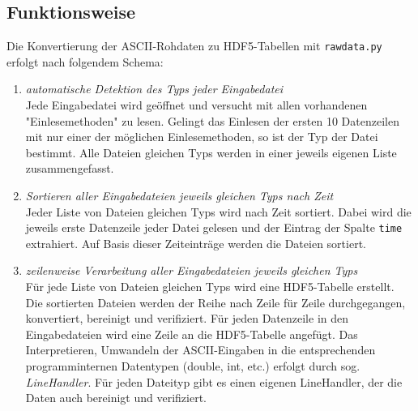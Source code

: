 \documentclass[version=last,
	a4paper,			%
	pagesize, 			%
	11pt,				%
	BCOR1cm,			%
	DIV12,	 			%
	pointlessnumbers,   %
	halfparskip,		%
]{scrreprt}
\begin{document}
\subsection{Funktionsweise}
Die Konvertierung der ASCII-Rohdaten zu HDF5-Tabellen mit \texttt{rawdata.py} erfolgt nach folgendem Schema:
\begin{enumerate}
  \item \emph{automatische Detektion des Typs jeder Eingabedatei}\\
        Jede Eingabedatei wird geöffnet und versucht mit allen vorhandenen "Einlesemethoden" zu lesen. Gelingt das Einlesen der ersten 10 Datenzeilen mit nur einer der möglichen Einlesemethoden, so ist der Typ der Datei bestimmt. Alle Dateien gleichen Typs werden in einer jeweils eigenen Liste zusammengefasst.
  \item \emph{Sortieren aller Eingabedateien jeweils gleichen Typs nach Zeit}\\
        Jeder Liste von Dateien gleichen Typs wird nach Zeit sortiert. Dabei wird die jeweils erste Datenzeile jeder Datei gelesen und der Eintrag der Spalte \texttt{time} extrahiert. Auf Basis dieser Zeiteinträge werden die Dateien sortiert.
  \item \emph{zeilenweise Verarbeitung aller Eingabedateien jeweils gleichen Typs}\\
        Für jede Liste von Dateien gleichen Typs wird eine HDF5-Tabelle erstellt. Die sortierten Dateien werden der Reihe nach Zeile für Zeile durchgegangen, konvertiert, bereinigt und verifiziert. Für jeden Datenzeile in den Eingabedateien wird eine Zeile an die HDF5-Tabelle angefügt. Das Interpretieren, Umwandeln der ASCII-Eingaben in die entsprechenden programminternen Datentypen (double, int, etc.) erfolgt durch sog. \emph{LineHandler}. Für jeden Dateityp gibt es einen eigenen LineHandler, der die Daten auch bereinigt und verifiziert.

\end{enumerate}
\end{document}
